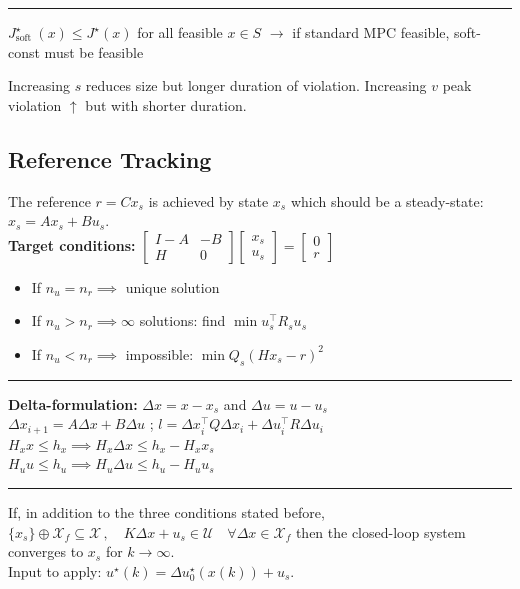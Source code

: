 \documentclass[10pt,a4paper,landscape]{article}
\newcommand{\quadRule}{\vspace{-3pt}\rule{0.23\textwidth}{0.4pt}}
\begin{document}
\begin{multicols*}{4}
\quadRule

$J_{\text {soft }}^{\star}(x) \leq J^{\star}(x)$ for all feasible $x \in S$  $\rightarrow$ if standard MPC feasible, soft-const must be feasible

Increasing $s$ reduces size but longer duration of violation. Increasing $v$ peak violation $\uparrow$ but with shorter duration.

\subsection{Reference Tracking}
The reference $r = Cx_s$ is achieved by state $x_s$ which should be a steady-state: $x_s = Ax_s + Bu_s$.\\
\textbf{Target conditions:} $\begin{bmatrix} 
	I-A & -B \\ H & 0 \end{bmatrix} 
\begin{bmatrix} x_s \\ u_s \end{bmatrix} = \begin{bmatrix} 0 \\ r \end{bmatrix}$\\
\begin{itemize}
	\item If $n_u = n_r \implies$ unique solution
	\item If $n_u > n_r \implies \infty$ solutions: find $\min u_s^\top R_s u_s$
	\item If $n_u < n_r \implies$ impossible: $\min Q_s (Hx_s-r)^2$
\end{itemize}

\quadRule

\textbf{Delta-formulation:} $\Delta x = x - x_s$ and $\Delta u = u - u_s$\\
$\Delta x_{i+1} = A\Delta x + B\Delta u$ ; $l = \Delta x_i^\top Q \Delta x_i + \Delta u_i^\top R \Delta u_i$\\
$H_x x\leq h_x \implies H_x \Delta x \leq h_x - H_x x_s$\\
$H_u u \leq h_u \implies H_u \Delta u \leq h_u - H_u u_s$

\quadRule

If, in addition to the three conditions stated before,  $\{x_s\} \oplus \mathcal{X}_f \subseteq \mathcal{X} \, , \quad K\Delta x + u_s \in \mathcal{U} \quad \forall \Delta x \in \mathcal{X}_f$ then the closed-loop system converges to $x_s$ for $k \to \infty$.\\
Input to apply: $u^\star(k) = \Delta u^\star_0(x(k)) + u_s$.

\end{multicols*}
\end{document}
